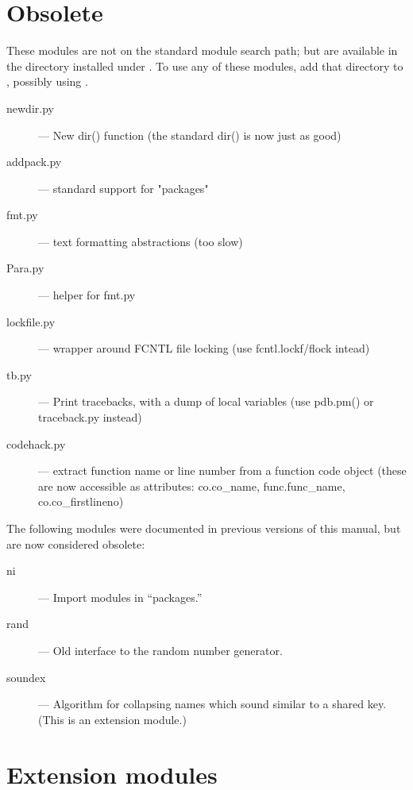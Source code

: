 \section{Obsolete}

These modules are not on the standard module search path;
but are available in the directory  installed  under
.  To use any of these
modules, add that directory to , possibly using
.

\begin{description}
\item[newdir.py]
--- New dir() function (the standard dir() is now just as good)

\item[addpack.py]
--- standard support for "packages"

\item[fmt.py]
--- text formatting abstractions (too slow)

\item[Para.py]
--- helper for fmt.py

\item[lockfile.py]
--- wrapper around FCNTL file locking (use
fcntl.lockf/flock intead)

\item[tb.py]
--- Print tracebacks, with a dump of local variables (use
pdb.pm() or traceback.py instead)

\item[codehack.py]
--- extract function name or line number from a function
code object (these are now accessible as attributes: co.co_name,
func.func_name, co.co_firstlineno)
\end{description}

The following modules were documented in previous versions of this
manual, but are now considered obsolete:

\begin{description}
\item[ni]
--- Import modules in ``packages.''

\item[rand]
--- Old interface to the random number generator.

\item[soundex]
--- Algorithm for collapsing names which sound similar to a shared
key.  (This is an extension module.)
\end{description}


\section{Extension modules}

